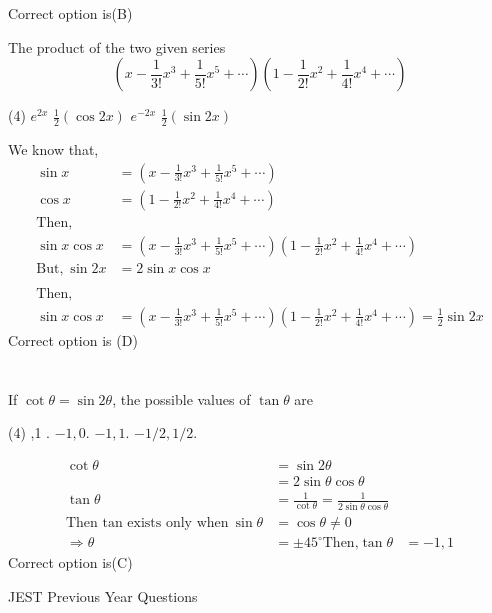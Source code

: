 \begin{questions}
\begin{answer}
		Correct option is(B)
	\end{answer}
	\begin{minipage}{\textwidth}
		\question  The product of the two given series
		$$
		\left(x-\frac{1}{3 !} x^{3}+\frac{1}{5 !} x^{5}+\cdots\right)\left(1-\frac{1}{2 !} x^{2}+\frac{1}{4 !} x^{4}+\cdots\right)
		$$
		{}
	\end{minipage}
	\begin{tasks}(4)
		\task[\textbf{A.}] $e^{2 x}$
		\task[\textbf{B.}] $\frac{1}{2}(\cos 2 x)$
		\task[\textbf{C.}] $e^{-2 x}$
		\task[\textbf{D.}] $\frac{1}{2}(\sin 2 x)$
	\end{tasks}
	\begin{answer}
		We know that,
		\begin{align*}
		\sin x&=\left(x-\frac{1}{3 !} x^{3}+\frac{1}{5 !} x^{5}+\cdots\right)\\
		\cos x&=\left(1-\frac{1}{2 !} x^{2}+\frac{1}{4 !} x^{4}+\cdots\right)\\
		\text{Then,}\\
		\sin x \cos x&=\left(x-\frac{1}{3 !} x^{3}+\frac{1}{5 !} x^{5}+\cdots\right)\left(1-\frac{1}{2 !} x^{2}+\frac{1}{4 !} x^{4}+\cdots\right)\\
		\text{But,}\ \sin 2x&=2\sin x \cos x\\\\
		\text{Then,}\\
		\sin x \cos x&=\left(x-\frac{1}{3 !} x^{3}+\frac{1}{5 !} x^{5}+\cdots\right)\left(1-\frac{1}{2 !} x^{2}+\frac{1}{4 !} x^{4}+\cdots\right)=\frac{1}{2}\sin 2x
		\end{align*}
		Correct option is (D)
	\end{answer}
	
	\section*{}
	
	\begin{minipage}{\textwidth}
		\question If $\cot \theta=\sin 2 \theta$, the possible values of $\tan \theta$ are
		{}
	\end{minipage}
	\begin{tasks}(4)
		,1 . 
		\task[\textbf{B.}]$-1,0$. 
		\task[\textbf{C.}]$-1,1$. 
		\task[\textbf{D.}]$-1 / 2,1 / 2$. 
	\end{tasks}
	\begin{answer}
		\begin{align*}
		\cot \theta&=\sin 2 \theta\\
		&=2\sin \theta \cos \theta\\
		\tan \theta &=\frac{1}{\cot \theta}=\frac{1}{2\sin \theta \cos \theta}\\
		\text{Then tan exists only when}\ \sin \theta &= \cos \theta \neq 0\\
		\Rightarrow \theta&= \pm 45^{\circ}
		\text{Then,} \tan \theta &=-1,1
		\end{align*}
		Correct option is(C)
	\end{answer}
	\begin{abox}
		JEST Previous Year Questions
	\end{abox}

\end{questions}
